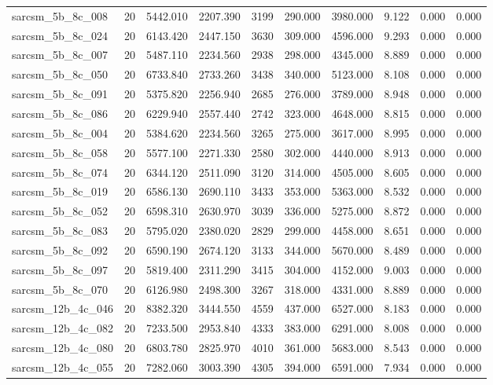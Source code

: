 \begin{tabular}{lrrrrrrrrr}
sarcsm\_5b\_8c\_008 & 20 & 5442.010 & 2207.390 & 3199 & 290.000 & 3980.000 & 9.122 & 0.000 & 0.000 \\
sarcsm\_5b\_8c\_024 & 20 & 6143.420 & 2447.150 & 3630 & 309.000 & 4596.000 & 9.293 & 0.000 & 0.000 \\
sarcsm\_5b\_8c\_007 & 20 & 5487.110 & 2234.560 & 2938 & 298.000 & 4345.000 & 8.889 & 0.000 & 0.000 \\
sarcsm\_5b\_8c\_050 & 20 & 6733.840 & 2733.260 & 3438 & 340.000 & 5123.000 & 8.108 & 0.000 & 0.000 \\
sarcsm\_5b\_8c\_091 & 20 & 5375.820 & 2256.940 & 2685 & 276.000 & 3789.000 & 8.948 & 0.000 & 0.000 \\
sarcsm\_5b\_8c\_086 & 20 & 6229.940 & 2557.440 & 2742 & 323.000 & 4648.000 & 8.815 & 0.000 & 0.000 \\
sarcsm\_5b\_8c\_004 & 20 & 5384.620 & 2234.560 & 3265 & 275.000 & 3617.000 & 8.995 & 0.000 & 0.000 \\
sarcsm\_5b\_8c\_058 & 20 & 5577.100 & 2271.330 & 2580 & 302.000 & 4440.000 & 8.913 & 0.000 & 0.000 \\
sarcsm\_5b\_8c\_074 & 20 & 6344.120 & 2511.090 & 3120 & 314.000 & 4505.000 & 8.605 & 0.000 & 0.000 \\
sarcsm\_5b\_8c\_019 & 20 & 6586.130 & 2690.110 & 3433 & 353.000 & 5363.000 & 8.532 & 0.000 & 0.000 \\
sarcsm\_5b\_8c\_052 & 20 & 6598.310 & 2630.970 & 3039 & 336.000 & 5275.000 & 8.872 & 0.000 & 0.000 \\
sarcsm\_5b\_8c\_083 & 20 & 5795.020 & 2380.020 & 2829 & 299.000 & 4458.000 & 8.651 & 0.000 & 0.000 \\
sarcsm\_5b\_8c\_092 & 20 & 6590.190 & 2674.120 & 3133 & 344.000 & 5670.000 & 8.489 & 0.000 & 0.000 \\
sarcsm\_5b\_8c\_097 & 20 & 5819.400 & 2311.290 & 3415 & 304.000 & 4152.000 & 9.003 & 0.000 & 0.000 \\
sarcsm\_5b\_8c\_070 & 20 & 6126.980 & 2498.300 & 3267 & 318.000 & 4331.000 & 8.889 & 0.000 & 0.000 \\
sarcsm\_12b\_4c\_046 & 20 & 8382.320 & 3444.550 & 4559 & 437.000 & 6527.000 & 8.183 & 0.000 & 0.000 \\
sarcsm\_12b\_4c\_082 & 20 & 7233.500 & 2953.840 & 4333 & 383.000 & 6291.000 & 8.008 & 0.000 & 0.000 \\
sarcsm\_12b\_4c\_080 & 20 & 6803.780 & 2825.970 & 4010 & 361.000 & 5683.000 & 8.543 & 0.000 & 0.000 \\
sarcsm\_12b\_4c\_055 & 20 & 7282.060 & 3003.390 & 4305 & 394.000 & 6591.000 & 7.934 & 0.000 & 0.000 \\

\end{tabular}

